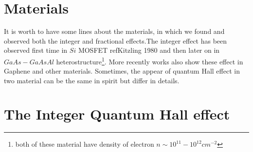 \documentclass[unnumsec,webpdf,modern,large]{mam-authoring-template}%
\theoremstyle{thmstyleone}%
\theoremstyle{thmstyletwo}%
\theoremstyle{thmstylethree}%
\begin{document}
\section{Materials}
\quad It is worth to have some lines about the materials, in which we found and observed both the integer and fractional effects.The integer effect has been observed first time in \(Si\) MOSFET ref{Kitzling 1980} and then later on in \(GaAs-GaAsAl\) heterostructure\footnote{both of these material have density of electron \(n \sim 10^{11} - 10^{12} cm^{-2}\)}. More recently works also show these effect in Gaphene and other materials. Sometimes, the appear of quantum Hall effect in two material can be the same in spirit but differ in details.

\section{The Integer Quantum Hall effect}\label{Integer QHE theory}
\end{document}

